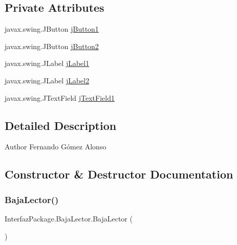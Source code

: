 \subsection*{Private Attributes}
\begin{DoxyCompactItemize}
\item 
javax.\+swing.\+J\+Button \mbox{\hyperlink{class_interfaz_package_1_1_baja_lector_ac8cdd8217744e010d4f23c911fafda3e}{j\+Button1}}
\item 
javax.\+swing.\+J\+Button \mbox{\hyperlink{class_interfaz_package_1_1_baja_lector_aea778ac52e2bd99213ebd7e1c1d23e09}{j\+Button2}}
\item 
javax.\+swing.\+J\+Label \mbox{\hyperlink{class_interfaz_package_1_1_baja_lector_aa981bd8695b99b2bfaf0d7af80e1475b}{j\+Label1}}
\item 
javax.\+swing.\+J\+Label \mbox{\hyperlink{class_interfaz_package_1_1_baja_lector_a9b41f7f44ecf39652a7f7938173d29c5}{j\+Label2}}
\item 
javax.\+swing.\+J\+Text\+Field \mbox{\hyperlink{class_interfaz_package_1_1_baja_lector_a7a476ef16a2314a268fb7e53e32cdd31}{j\+Text\+Field1}}
\end{DoxyCompactItemize}


\subsection{Detailed Description}
\begin{DoxyAuthor}{Author}
Fernando Gómez Alonso 
\end{DoxyAuthor}


\subsection{Constructor \& Destructor Documentation}
\mbox{\label{class_interfaz_package_1_1_baja_lector_a524ec2212ed63f49b7de4c5743319766}} 
\subsubsection{\texorpdfstring{Baja\+Lector()}{BajaLector()}}
{\footnotesize\ttfamily Interfaz\+Package.\+Baja\+Lector.\+Baja\+Lector (\begin{DoxyParamCaption}{ }\end{DoxyParamCaption})\hspace{0.3cm}{\ttfamily [inline]}}

